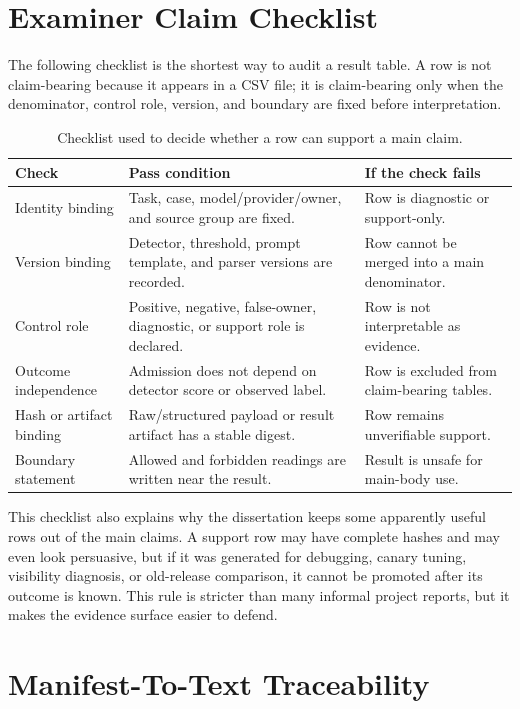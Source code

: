 \section{Examiner Claim Checklist}

The following checklist is the shortest way to audit a result table. A row is not claim-bearing because it appears in a CSV file; it is claim-bearing only when the denominator, control role, version, and boundary are fixed before interpretation.

\begin{table}[htbp]
\centering
\caption{Checklist used to decide whether a row can support a main claim.}
\label{tab:examiner-claim-checklist}
\tighttable
\begin{tabularx}{\textwidth}{@{}L{2.10cm}YY@{}}
\toprule
Check & Pass condition & If the check fails \\
\midrule
Identity binding & Task, case, model/provider/owner, and source group are fixed. & Row is diagnostic or support-only. \\
Version binding & Detector, threshold, prompt template, and parser versions are recorded. & Row cannot be merged into a main denominator. \\
Control role & Positive, negative, false-owner, diagnostic, or support role is declared. & Row is not interpretable as evidence. \\
Outcome independence & Admission does not depend on detector score or observed label. & Row is excluded from claim-bearing tables. \\
Hash or artifact binding & Raw/structured payload or result artifact has a stable digest. & Row remains unverifiable support. \\
Boundary statement & Allowed and forbidden readings are written near the result. & Result is unsafe for main-body use. \\
\bottomrule
\end{tabularx}
\end{table}

This checklist also explains why the dissertation keeps some apparently useful rows out of the main claims. A support row may have complete hashes and may even look persuasive, but if it was generated for debugging, canary tuning, visibility diagnosis, or old-release comparison, it cannot be promoted after its outcome is known. This rule is stricter than many informal project reports, but it makes the evidence surface easier to defend.

\section{Manifest-To-Text Traceability}

